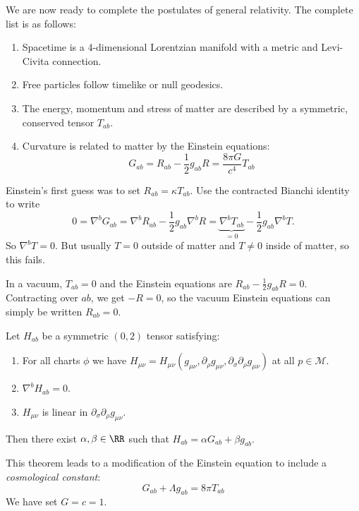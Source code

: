 \documentclass{jknotes}
\begin{document}
We are now ready to complete the postulates of general relativity. The complete list is as follows:
\begin{enumerate}
    \item Spacetime is a 4-dimensional Lorentzian manifold with a metric and Levi-Civita connection.
    \item Free particles follow timelike or null geodesics.
    \item The energy, momentum and stress of matter are described by a symmetric, conserved tensor \(T_{ab}\).
    \item Curvature is related to matter by the Einstein equations:
        \begin{equation}
            G_{ab} = R_{ab} - \frac12 g_{ab} R = \frac{8\pi G}{c^4} T_{ab}
        \end{equation}
\end{enumerate}
Einstein's first guess was to set \(R_{ab} = \kappa T_{ab}\). Use the contracted Bianchi identity to write
\begin{equation}
    0 = \nabla^b G_{ab} = \nabla^b R_{ab} -\frac12g_{ab}\nabla^b R = \underbrace{\nabla^b T_{ab}}_{=0} - \frac12g_{ab}\nabla^bT.
\end{equation}
So \(\nabla^b T = 0\). But usually \(T=0\) outside of matter and \(T\ne0\) inside of matter, so this fails. 

In a vacuum, \(T_{ab}=0\) and the Einstein equations are \(R_{ab}-\frac12g_{ab}R=0\). Contracting over \(ab\), we get \(-R=0\), so the vacuum Einstein equations can simply be written \(R_{ab} = 0\).

\begin{theorem}[Lovelock]
    Let \(H_{ab}\) be a symmetric \((0,2)\) tensor satisfying:
    \begin{enumerate}
        \item For all charts \(\phi\) we have \(H_{\mu\nu} = H_{\mu\nu}(g_{\mu\nu},\partial_\rho g_{\mu\nu},\partial_\sigma\partial_\rho g_{\mu\nu})\) at all \(p\in \mathcal{M}\).
        \item \(\nabla^b H_{ab}=0\).
        \item \(H_{\mu\nu}\) is linear in \(\partial_\sigma\partial_\rho g_{\mu\nu}\).
    \end{enumerate}
    Then there exist \(\alpha,\beta\in\RR\) such that \(H_{ab} = \alpha G_{ab} + \beta g_{ab}\).
\end{theorem}
This theorem leads to a modification of the Einstein equation to include a \emph{cosmological constant}:
\begin{equation}
    G_{ab} + \Lambda g_{ab} = 8\pi T_{ab}
\end{equation}
We have set \(G=c=1\).
\end{document}

